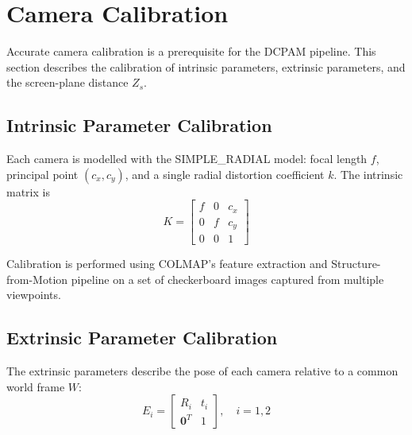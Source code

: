\section{Camera Calibration}
\label{sec:calibration}

Accurate camera calibration is a prerequisite for the DCPAM
pipeline.
%
This section describes the calibration of intrinsic
parameters, extrinsic parameters, and the screen-plane
distance $Z_s$.


\subsection{Intrinsic Parameter Calibration}
\label{sec:intrinsic}

Each camera is modelled with the SIMPLE\_RADIAL model:
focal length $f$, principal point $(c_x, c_y)$,
and a single radial distortion coefficient $k$.
%
The intrinsic matrix is
%
\begin{equation}
  K =
  \begin{bmatrix}
    f & 0 & c_x \\
    0 & f & c_y \\
    0 & 0 & 1
  \end{bmatrix}
  \label{eq:K}
\end{equation}

Calibration is performed using COLMAP's feature extraction
and Structure-from-Motion pipeline on a set of checkerboard
images captured from multiple viewpoints.



\subsection{Extrinsic Parameter Calibration}
\label{sec:extrinsic}

The extrinsic parameters describe the pose of each camera
relative to a common world frame $W$:
%
\begin{equation}
  E_i =
  \begin{bmatrix}
    R_i & t_i \\
    \mathbf{0}^T & 1
  \end{bmatrix},
  \quad i = 1, 2
  \label{eq:extrinsic}
\end{equation}

